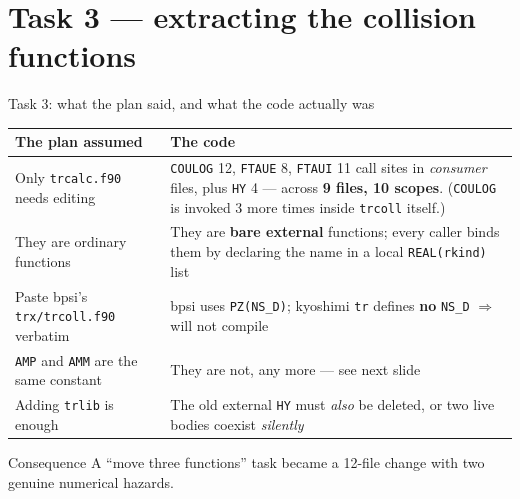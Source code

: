 \documentclass[10pt,aspectratio=169]{beamer}
\newcommand{\C}[1]{\texttt{\small #1}}          %
\begin{document}
\section{Task 3 --- extracting the collision functions}

\begin{frame}{Task 3: what the plan said, and what the code actually was}

\begin{center}
\small
\begin{tabular}{@{}p{}p{}@{}}
\toprule
\textbf{The plan assumed} & \textbf{The code} \\
\midrule
Only \C{trcalc.f90} needs editing
  & \C{COULOG} 12, \C{FTAUE} 8, \C{FTAUI} 11 call sites in \emph{consumer} files, plus \C{HY} 4 ---
    across \textbf{9 files, 10 scopes}. (\C{COULOG} is invoked 3 more times inside \C{trcoll} itself.) \\[0.3em]
They are ordinary functions
  & They are \textbf{bare external} functions; every caller binds them by declaring the name in a
    local \C{REAL(rkind)} list \\[0.3em]
Paste bpsi's \C{trx/trcoll.f90} verbatim
  & bpsi uses \C{PZ(NS\_D)}; kyoshimi \C{tr} defines \textbf{no} \C{NS\_D} $\Rightarrow$ will not compile \\[0.3em]
\C{AMP} and \C{AMM} are the same constant
  & \textcolor{bad}{They are not, any more} --- see next slide \\[0.3em]
Adding \C{trlib} is enough
  & The old external \C{HY} must \emph{also} be deleted, or two live bodies coexist \emph{silently} \\
\bottomrule
\end{tabular}
\end{center}

\vspace{0.3em}
\begin{block}{Consequence}
A ``move three functions'' task became a 12-file change with two genuine numerical hazards.
\end{block}
\end{frame}
\end{document}
